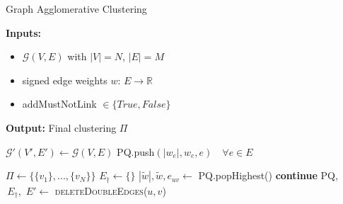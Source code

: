 \begin{algorithm}
  \caption{Graph Agglomerative Clustering}
\setlength{\parindent}{\algorithmicindent} \textbf{Inputs:}
     \begin{itemize}[leftmargin=1.3cm,topsep=0.1pt,itemsep=-1.ex]
   \item $\mathcal{G}(V,E)$ with $|V|=N$, $|E|=M$
   \item signed edge weights $w:\,E\rightarrow\mathbb{R}$
   \item {\color{blue}addMustNotLink} $\in \{ True, False\}$
   \end{itemize}
   \vspace{0.4em}
   
\setlength{\parindent}{\algorithmicindent} \textbf{Output:} Final clustering $\Pi$


  \hspace*{\algorithmicindent} 
  \begin{algorithmic}[1]


      \State $\mathcal{G}'(V', E') \gets \mathcal{G}(V, E)$  
        \State PQ.push$(|w_e|, w_e, e) \quad \forall e \in E $  
      
      \State $\Pi \gets \{ \{v_1\}, ..., \{v_N\} \}$ 
      \State $E_\dagger \gets \{\}$ 
    \State
        \State $|\tilde{w}|, \tilde{w}, e_{uv} \gets $ PQ.popHighest()
            \State \textbf{continue}
        \EndIf
          \State PQ, $\,E_\dagger,\,\, E' \gets$ \textsc{deleteDoubleEdges}($u,v$)
          

\end{algorithmic}
\end{algorithm}
